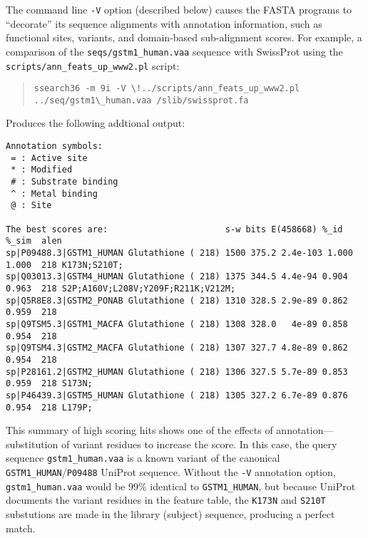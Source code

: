 \documentclass[11pt]{article}
\begin{document}
The command line \texttt{-V} option (described below) causes the FASTA
programs to ``decorate'' its sequence alignments with annotation
information, such as functional sites, variants, and domain-based
sub-alignment scores.  For example, a comparison of the
\texttt{seqs/gstm1\_human.vaa} sequence with SwissProt using the
\texttt{scripts/ann\_feats\_up\_www2.pl} script:
\begin{footnotesize}
\begin{quote}
\begin{verbatim}
ssearch36 -m 9i -V \!../scripts/ann_feats_up_www2.pl ../seq/gstm1\_human.vaa /slib/swissprot.fa
\end{verbatim}
\end{quote}
\end{footnotesize}
Produces the following addtional output:
\begin{footnotesize}
\begin{verbatim}
Annotation symbols:
 = : Active site
 * : Modified
 # : Substrate binding
 ^ : Metal binding
 @ : Site

The best scores are:                       s-w bits E(458668) %_id  %_sim  alen
sp|P09488.3|GSTM1_HUMAN Glutathione ( 218) 1500 375.2 2.4e-103 1.000 1.000  218 K173N;S210T;
sp|Q03013.3|GSTM4_HUMAN Glutathione ( 218) 1375 344.5 4.4e-94 0.904 0.963  218 S2P;A160V;L208V;Y209F;R211K;V212M;
sp|Q5R8E8.3|GSTM2_PONAB Glutathione ( 218) 1310 328.5 2.9e-89 0.862 0.959  218
sp|Q9TSM5.3|GSTM1_MACFA Glutathione ( 218) 1308 328.0   4e-89 0.858 0.954  218
sp|Q9TSM4.3|GSTM2_MACFA Glutathione ( 218) 1307 327.7 4.8e-89 0.862 0.954  218
sp|P28161.2|GSTM2_HUMAN Glutathione ( 218) 1306 327.5 5.7e-89 0.853 0.959  218 S173N;
sp|P46439.3|GSTM5_HUMAN Glutathione ( 218) 1305 327.2 6.7e-89 0.876 0.954  218 L179P;
\end{verbatim}
\end{footnotesize}
This summary of high scoring hits shows one of the effects of
annotation---substitution of variant residues to increase the score.
In this case, the query sequence \texttt{gstm1\_human.vaa} is a known
variant of the canonical \texttt{GSTM1\_HUMAN}/\texttt{P09488} UniProt
sequence.  Without the \texttt{-V} annotation option,
\texttt{gstm1\_human.vaa} would be 99\% identical to
\texttt{GSTM1\_HUMAN}, but because UniProt documents the variant
residues in the feature table, the \texttt{K173N} and \texttt{S210T}
substutions are made in the library (subject) sequence, producing a
perfect match.
\end{document}
